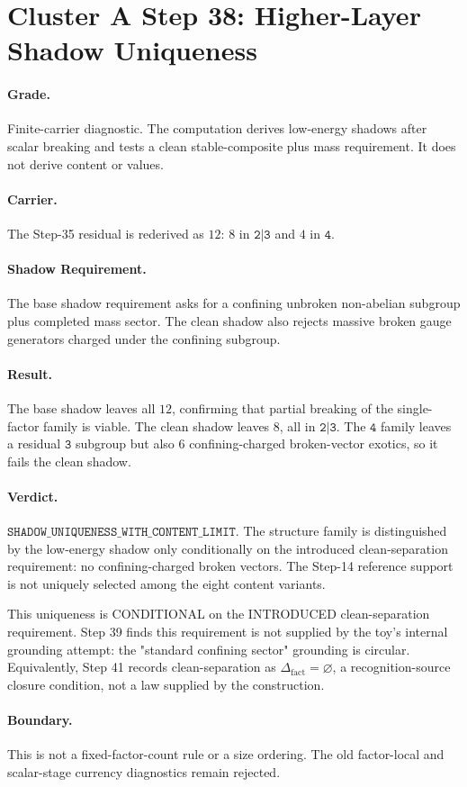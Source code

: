 \section*{Cluster A Step 38: Higher-Layer Shadow Uniqueness}

\paragraph{Grade.}
Finite-carrier diagnostic. The computation derives low-energy shadows after scalar breaking and tests a clean stable-composite plus mass requirement. It does not derive content or values.

\paragraph{Carrier.}
The Step-35 residual is rederived as \(12\): \(8\) in \(\texttt{2|3}\) and \(4\) in \(\texttt{4}\).

\paragraph{Shadow Requirement.}
The base shadow requirement asks for a confining unbroken non-abelian subgroup plus completed mass sector. The clean shadow also rejects massive broken gauge generators charged under the confining subgroup.

\paragraph{Result.}
The base shadow leaves all \(12\), confirming that partial breaking of the single-factor family is viable. The clean shadow leaves \(8\), all in \(\texttt{2|3}\). The \(\texttt{4}\) family leaves a residual \(\texttt{3}\) subgroup but also \(6\) confining-charged broken-vector exotics, so it fails the clean shadow.

\paragraph{Verdict.}
\(\texttt{SHADOW\_UNIQUENESS\_WITH\_CONTENT\_LIMIT}\). The structure family is distinguished by the low-energy shadow only conditionally on the introduced clean-separation requirement: no confining-charged broken vectors. The Step-14 reference support is not uniquely selected among the eight content variants.

This uniqueness is CONDITIONAL on the INTRODUCED clean-separation requirement. Step 39 finds this requirement is not supplied by the toy's internal grounding attempt: the "standard confining sector" grounding is circular. Equivalently, Step 41 records clean-separation as \(\Delta_{\mathrm{fact}}=\varnothing\), a recognition-source closure condition, not a law supplied by the construction.

\paragraph{Boundary.}
This is not a fixed-factor-count rule or a size ordering. The old factor-local and scalar-stage currency diagnostics remain rejected.
